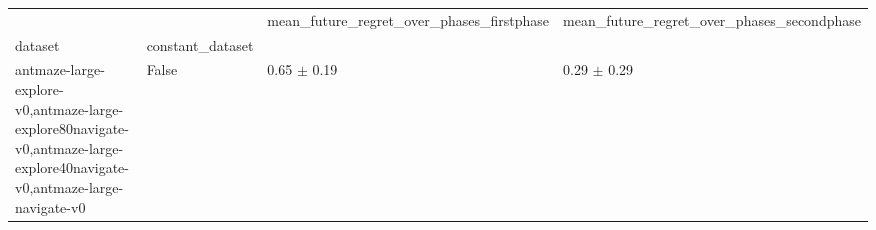 \begin{tabular}{llll}
\toprule
 &  & mean_future_regret_over_phases_firstphase & mean_future_regret_over_phases_secondphase \\
dataset & constant_dataset &  &  \\
\midrule
antmaze-large-explore-v0,antmaze-large-explore80navigate-v0,antmaze-large-explore40navigate-v0,antmaze-large-navigate-v0 & False & 0.65 $\pm$ 0.19 & 0.29 $\pm$ 0.29 \\
\cline{1-4}
\bottomrule
\end{tabular}
